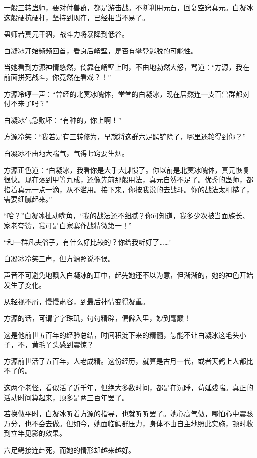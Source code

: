 
\begin{this_body}

一般三转蛊师，要对付兽群，都是游击战。不断利用元石，回复空窍真元。白凝冰这般硬抗硬打，坚持到现在，已经相当不易了。

蛊师若真元干涸，战斗力将暴降到低谷。

白凝冰开始频频回首，看身后峭壁，是否有攀登逃脱的可能性。

当她看到方源神情悠然，倚靠在峭壁上时，不由地勃然大怒，骂道：“方源，我在前面拼死战斗，你竟然在看戏？！”

方源冷哼一声：“曾经的北冥冰魄体，堂堂的白凝冰，现在居然连一支百兽群都对付不来了吗？”

白凝冰气急败坏：“有种的，你上啊！”

方源冷笑：“我若是有三转修为，早就将这群六足鳄铲除了，哪里还轮得到你？”

白凝冰不由地大喘气，气得七窍要生烟。

方源正色道：“白凝冰，我看你是大手大脚惯了。你以前是北冥冰魄体，真元恢复很快。现在落到甲等九成，还像先前那般用法，真元自然不足了。优秀的蛊师，都掐着真元一点一滴，从不滥用。接下来，你按我说的去战斗。你的战法太粗糙了，需要细腻起来。”

“哈？”白凝冰扯动嘴角，“我的战法还不细腻？你可知道，我多少次被当面族长、家老夸赞，我可是白家寨作战精微第一！”

“和一群凡夫俗子，有什么好比较的？你给我听好了……”

白凝冰冷笑三声，但方源照说不误。

声音不可避免地飘入白凝冰的耳中，起先她还不以为意，但渐渐的，她的神色开始发生了变化。

从轻视不屑，慢慢肃容，到最后神情变得凝重。

方源的话，可谓字字珠玑，句句精辟，偏僻入里，妙到毫巅！

这是他前世五百年的经验总结，时间积淀下来的精髓，怎能不让白凝冰这毛头小子，不，黄毛丫头感到震惊？

方源前世活了五百年，人老成精。这份经历，就算是古月一代，或者天鹤上人都比不了的。

这两个老怪，看似活了近千年，但绝大多数时间，都是在沉睡，苟延残喘。真正的活动时间算起来，顶多是两三百年罢了。

若换做平时，白凝冰听着方源的指导，也就听听罢了。她心高气傲，哪怕心中震骇万分，也不会去做。但如今，她面临鳄群压力，身体不由自主地照此实施，顿时收到立竿见影的效果。

六足鳄接连赴死，而她的情形却越来越好。


\end{this_body}

